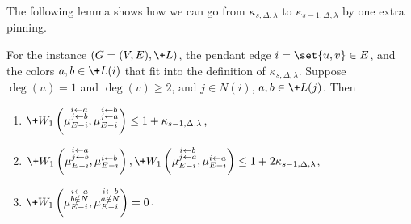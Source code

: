 \documentclass[a4paper,11pt]{article}
\newcommand{\W}[1]{\+W_1\left(#1\right)}
\begin{document}
The following lemma shows how we can go from $\kappa_{s, \Delta, \lambda}$ to $\kappa_{s-1, \Delta, \lambda}$
by one extra pinning.
\begin{lemma}\label{lem:s-to-s-1}
    For the instance $(G=(V, E), \+L)$, the pendant edge $i=\set{u, v}\in E$, and the colors $a, b\in \+L(i)$
    that fit into the definition of $\kappa_{s, \Delta, \lambda}$. 
    Suppose $\deg(u)=1$ and $\deg(v)\ge 2$, and $j\in N(i)$, $a, b\in \+L(j)$.
    Then
    \begin{enumerate}
        \item $\W{\mab, \mba} \le 1 + \kappa_{s-1, \Delta, \lambda}$,
        \item $\W{\mab, \mb}, \W{\mba, \ma} \le 1 + 2\kappa_{s-1, \Delta, \lambda}$,
        \item $\W{\man, \mbn} = 0$.
    \end{enumerate}
\end{lemma}
\end{document}
